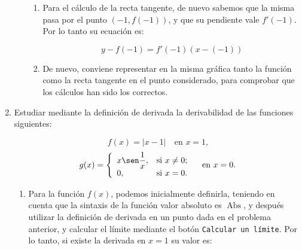\begin{enumerate}[leftmargin=*]
\begin{enumerate}
\begin{indicacion}
{\begin{enumerate}
\[
f'(a) = \mathop {\lim }\limits_{h \to 0} \frac{{f(a + h) - f(a)}}
{h}
\]
en donde, por aligerar la notación, hemos llamado $h$ a lo que en
la teoría denominábamos $\Delta x$.

Por lo tanto, para calcular la derivada de la función $f$ en
$a=-1$ mediante la definición, procedemos con:

\[
f'(-1) = \mathop {\lim }\limits_{h \to 0} \frac{{f(-1 + h) -
f(-1)}} {h}
\]

Para calcular el límite, podemos utilizar el botón
\texttt{Calcular un límite} de la barra de botones.

\item Para el cálculo de la recta tangente, de nuevo sabemos que
la misma pasa por el punto $(-1, f(-1))$, y que su pendiente vale
$f'(-1)$. Por lo tanto su ecuación es:

\[
y - f( - 1) = f'(-1)\left( {x - ( - 1)} \right)
\]

\item De nuevo, conviene representar en la misma gráfica tanto la
función como la recta tangente en el punto considerado, para
comprobar que los cálculos han sido los correctos.

\end{enumerate}
}
\end{indicacion}


\end{enumerate}




\item Estudiar mediante la definición de derivada la derivabilidad
de las funciones siguientes:


\[
f(x)=|x-1| \quad \textrm{en $x=1$,}
\]
\[
g(x)=\left\{%
\begin{array}{ll}
   x \sen\dfrac{1}{x}, & \hbox{si $x\neq 0$;} \\
   0, & \hbox{si $x=0$.} \\
\end{array}%
\right. \quad \textrm{en $x=0$.}
\]

\begin{indicacion}
{
\begin{enumerate}
\item Para la función $f(x)$, podemos inicialmente definirla,
teniendo en cuenta que la sintaxis de la función valor absoluto es
$\operatorname{Abs}$, y después utilizar la definición de derivada
en un punto dada en el problema anterior, y calcular el límite
mediante el botón \texttt{Calcular un límite}. Por lo tanto, si
existe la derivada en $x=1$ su valor es:



\end{enumerate}}
\end{indicacion}
\end{enumerate}
